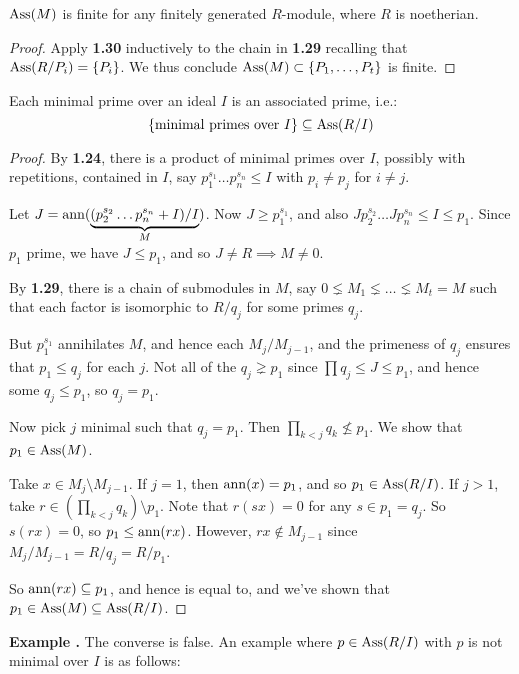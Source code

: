 \documentclass[10pt,a4paper]{article}
\begin{document}
\begin{lemma}
  $\operatorname{Ass}(M)$ is finite for any finitely generated $R$-module, where $R$ is noetherian.
\end{lemma}
\begin{proof}
  Apply \textbf{1.30} inductively to the chain in \textbf{1.29} recalling that $\operatorname{Ass}(R/P_i) = \{P_i\}$. We thus conclude $\operatorname{Ass}(M) \subset \{P_1, \ldots, P_t\}$ is finite.
\end{proof}
\begin{proposition}
  Each minimal prime over an ideal $I$ is an associated prime, i.e.:
  \[\{\text{minimal primes over }I\} \subseteq \operatorname{Ass}(R/I)\]
\end{proposition}
\begin{proof}
  By \textbf{1.24}, there is a product of minimal primes over $I$, possibly with repetitions, contained in $I$, say $p_1^{s_1}\ldots p_n^{s_n} \leq I$ with $p_i \neq p_j$ for $i\neq j$.

  Let $J = \operatorname{ann}(\underbrace{(p_2^{s_2}\ldots p_n^{s_n} + I)/I}_M)$. Now $J \geq p_1^{s_1}$, and also $Jp_2^{s_2}\ldots Jp_n^{s_n} \leq I \leq p_1$. Since $p_1$ prime, we have $J \leq p_1$, and so $J \neq R \implies M \neq 0$.

  By \textbf{1.29}, there is a chain of submodules in $M$, say $0\lneq M_1 \lneq \ldots \lneq M_t =M$ such that each factor is isomorphic to $R/q_j$ for some primes $q_j$.

  But $p_1^{s_1}$ annihilates $M$, and hence each $M_j/M_{j-1}$, and the primeness of $q_j$ ensures that $p_1 \leq q_j$ for each $j$. Not all of the $q_j \gneq p_1$ since $\prod q_j \leq J \leq p_1$, and hence some $q_j \leq p_1$, so $q_j = p_1$.

  Now pick $j$ minimal such that $q_j = p_1$. Then $\prod_{k<j} q_k \nleq p_1$. We show that $p_1 \in \operatorname{Ass}(M)$.

  Take $x \in M_j\setminus M_{j-1}$. If $j = 1$, then $\operatorname{ann}(x) = p_1$, and so $p_1 \in \operatorname{Ass}(R/I)$. If $j > 1$, take $r \in (\prod_{k<j} q_k)\setminus p_1$. Note that $r(sx) = 0$ for any $s \in p_1=q_j$. So $s(rx) = 0$, so $p_1 \leq \operatorname{ann}(rx)$. However, $rx \notin M_{j-1}$ since $M_j/M_{j-1} = R/q_j = R/p_1$.

  So $\operatorname{ann}(rx) \subseteq p_1$, and hence is equal to, and we've shown that $p_1 \in \operatorname{Ass}(M) \subseteq \operatorname{Ass}(R/I)$.
\end{proof}

\textbf{Example \thetheorem.} The converse is false. An example where $p \in \operatorname{Ass}(R/I)$ with $p$ is not minimal over $I$ is as follows:
\end{document}
